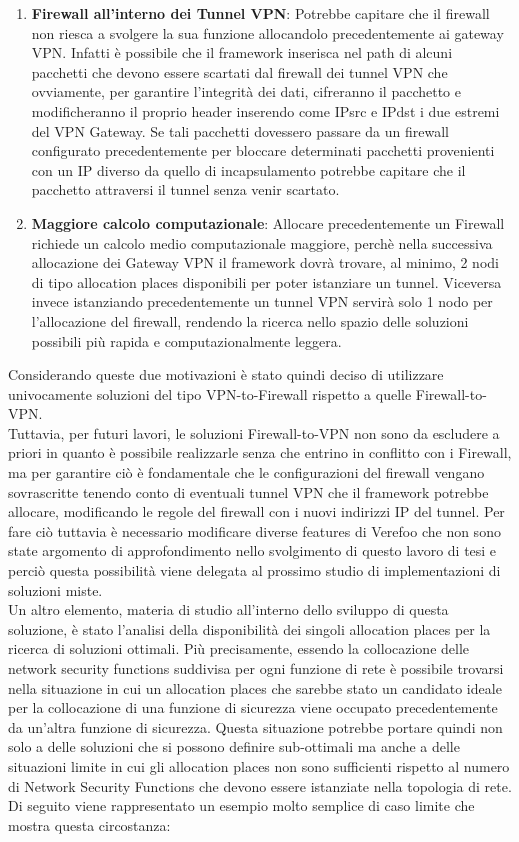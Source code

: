 \begin{enumerate}
    \item \textbf{Firewall all'interno dei Tunnel VPN}: Potrebbe capitare che il firewall non riesca a svolgere la sua funzione allocandolo precedentemente ai gateway VPN. Infatti è possibile che il framework
        inserisca nel path di alcuni pacchetti che devono essere scartati dal firewall dei tunnel VPN che ovviamente, per garantire l'integrità dei dati, cifreranno il pacchetto e modificheranno il proprio header
        inserendo come IPsrc e IPdst i due estremi del VPN Gateway. Se tali pacchetti dovessero passare da un firewall configurato precedentemente per bloccare determinati pacchetti provenienti con un IP diverso da quello di incapsulamento 
        potrebbe capitare che il pacchetto attraversi il tunnel senza venir scartato.
    \item \textbf{Maggiore calcolo computazionale}: Allocare precedentemente un Firewall richiede un calcolo medio computazionale maggiore, perchè nella successiva allocazione dei Gateway VPN il framework dovrà trovare, al minimo, 2 nodi 
        di tipo allocation places disponibili per poter istanziare un tunnel. Viceversa invece istanziando precedentemente un tunnel VPN servirà solo 1 nodo per l'allocazione del firewall, rendendo la ricerca nello spazio delle soluzioni possibili
        più rapida e computazionalmente leggera.
\end{enumerate}

Considerando queste due motivazioni è stato quindi deciso di utilizzare univocamente soluzioni del tipo VPN-to-Firewall rispetto a quelle Firewall-to-VPN.\\
Tuttavia, per futuri lavori, le soluzioni Firewall-to-VPN non sono da escludere a priori in quanto è possibile realizzarle senza che entrino in conflitto con i Firewall, ma per 
garantire ciò è fondamentale che le configurazioni del firewall vengano sovrascritte tenendo conto di eventuali tunnel VPN che il framework potrebbe allocare, modificando le regole del firewall con i nuovi indirizzi IP del tunnel. Per fare ciò tuttavia è necessario modificare
diverse features di Verefoo che non sono state argomento di approfondimento nello svolgimento di questo lavoro di tesi e perciò questa possibilità viene delegata al prossimo studio di implementazioni di soluzioni miste.
\\
Un altro elemento, materia di studio all'interno dello sviluppo di questa soluzione, è stato l'analisi della disponibilità dei singoli allocation places per la ricerca di soluzioni ottimali.
Più precisamente, essendo la collocazione delle network security functions suddivisa per ogni funzione di rete è possibile trovarsi nella situazione in cui un allocation places che sarebbe stato un candidato ideale per la collocazione di una funzione di sicurezza viene occupato
precedentemente da un'altra funzione di sicurezza. Questa situazione potrebbe portare quindi non solo a delle soluzioni che si possono definire sub-ottimali ma anche a delle situazioni limite in cui gli allocation places non sono sufficienti rispetto al numero di Network Security Functions
che devono essere istanziate nella topologia di rete. Di seguito viene rappresentato un esempio molto semplice di caso limite che mostra questa circostanza: 

